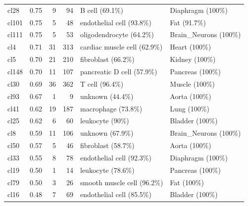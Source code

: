 \begin{table}[ht!]
\begin{tabular}{lrrrll}
  cl28 & 0.75 &   9 &  94 & B cell (69.1\%) & Diaphragm (100\%) \\ 
  cl101 & 0.75 &   5 &  48 & endothelial cell (93.8\%) & Fat (91.7\%) \\ 
  cl111 & 0.75 &   5 &  53 & oligodendrocyte (64.2\%) & Brain\_Neurons (100\%) \\ 
  cl4 & 0.71 &  31 & 313 & cardiac muscle cell (62.9\%) & Heart (100\%) \\ 
  cl5 & 0.70 &  21 & 210 & fibroblast (66.2\%) & Kidney (100\%) \\ 
  cl148 & 0.70 &  11 & 107 & pancreatic D cell (57.9\%) & Pancreas (100\%) \\ 
  cl30 & 0.69 &  36 & 362 & T cell (96.4\%) & Muscle (100\%) \\ 
  cl93 & 0.67 &   1 &   9 & unknown (44.4\%) & Aorta (100\%) \\ 
  cl41 & 0.62 &  19 & 187 & macrophage (73.8\%) & Lung (100\%) \\ 
  cl25 & 0.62 &   6 &  60 & leukocyte (90\%) & Bladder (100\%) \\ 
  cl8 & 0.59 &  11 & 106 & unknown (67.9\%) & Brain\_Neurons (100\%) \\ 
  cl50 & 0.57 &   5 &  46 & fibroblast (58.7\%) & Aorta (100\%) \\ 
  cl33 & 0.55 &   8 &  78 & endothelial cell (92.3\%) & Diaphragm (100\%) \\ 
  cl19 & 0.50 &   1 &  14 & leukocyte (78.6\%) & Pancreas (100\%) \\ 
  cl79 & 0.50 &   3 &  26 & smooth muscle cell (96.2\%) & Fat (100\%) \\ 
  cl16 & 0.48 &   7 &  69 & endothelial cell (85.5\%) & Bladder (100\%) \\ 
   \bottomrule
\end{tabular}
\end{table}

